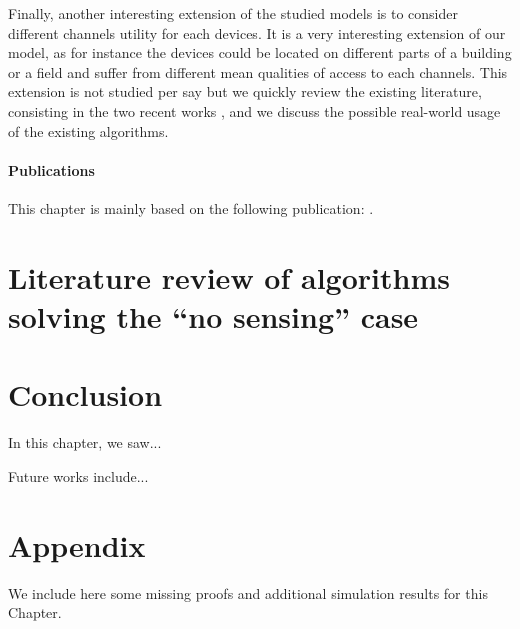 Finally, another interesting extension of the studied models is to consider different channels utility for each devices. It is a very interesting extension of our model, as for instance the devices could be located on different parts of a building or a field and suffer from different mean qualities of access to each channels.
This extension is not studied per say but we quickly review the existing literature, consisting in the two recent works \cite{Bistritz18,KaufmannAbbas19}, and we discuss the possible real-world usage of the existing algorithms.




\vfill{}

\paragraph{Publications}

This chapter is mainly based on the following publication: \cite{Besson2018ALT}.


\newpage
\graphicspath{{2-Chapters/5-Chapter/Images/}}
\graphicspath{{2-Chapters/5-Chapter/ALT_2018__MPBandits.git/figures/}}




\section{Literature review of algorithms solving the ``no sensing'' case}
\label{sec:5:noSensingCase}




\section{Conclusion}
\label{sec:5:conclusion}

In this chapter, we saw...

Future works include...



\section{Appendix}
\label{sec:5:appendix}

We include here some missing proofs and additional simulation results for this Chapter.



